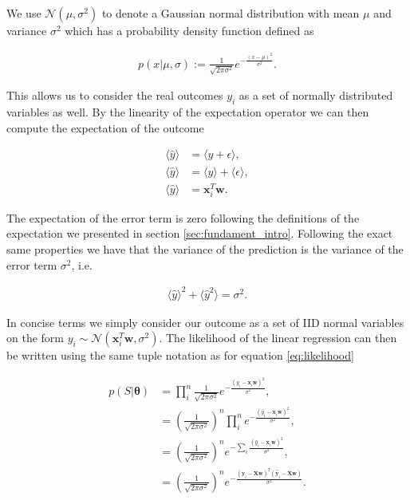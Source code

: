 \noindent We use $\mathcal{N}(\mu, \sigma^2)$ to denote a Gaussian normal distribution with mean $\mu$ and variance $\sigma^2$ which has a probability density function defined as 

\begin{align}
p(x | \mu, \sigma) := \frac{1}{\sqrt{2\pi \sigma^2}}e^{-\frac{(x - \mu)^2}{\sigma^2}}.
\end{align}

\noindent This allows us to consider the real outcomes $y_i$ as a set of normally distributed variables as well. By the linearity of the expectation operator we can then compute the expectation of the outcome 

\begin{align}
\langle \hat{y} \rangle &= \langle y + \epsilon \rangle,  \\
\langle \hat{y} \rangle &= \langle y \rangle + \langle \epsilon \rangle, \\
\langle \hat{y} \rangle &= \mathbf{x}_i^T\mathbf{w}.
\end{align}

\noindent The expectation of the error term is zero following the definitions of the expectation we presented in section \ref{sec:fundament_intro}. Following the exact same properties we have that the variance of the prediction is the variance of the error term $\sigma^2$, i.e. 

\begin{align}
\langle \hat{y}\rangle^2 + \langle \hat{y}^2\rangle = \sigma^2.
\end{align}

\noindent In concise terms we simply consider our outcome as a set of IID normal variables on the form $y_i \sim \mathcal{N}(\mathbf{x}_i^T\mathbf{w}, \sigma^2)$. The likelihood of the linear regression can then be written using the same tuple notation as for equation \ref{eq:likelihood}

\begin{align}
p(S|\mathbf{\theta}) 
&= \prod_i^n \frac{1}{\sqrt{2\pi \sigma^2}}e^{-\frac{(\hat{y}_i - \mathbf{x}_i\mathbf{w})^2}{\sigma^2}}, \\
&= \left(\frac{1}{\sqrt{2\pi \sigma^2}} \right)^n \prod_i^n e^{-\frac{(\hat{y}_i - \mathbf{x}_i\mathbf{w})^2}{\sigma^2}}, \\
&= \left(\frac{1}{\sqrt{2\pi \sigma^2}} \right)^n  e^{-\sum_i\frac{(\hat{y}_i - \mathbf{x}_i\mathbf{w})^2}{\sigma^2}}, \\
&= \left(\frac{1}{\sqrt{2\pi \sigma^2}} \right)^n  e^{-\frac{(\mathbf{\hat{y}}_i - \mathbf{X}\mathbf{w})^T(\mathbf{\hat{y}}_i - \mathbf{X}\mathbf{w})}{\sigma^2}} .
\end{align}

